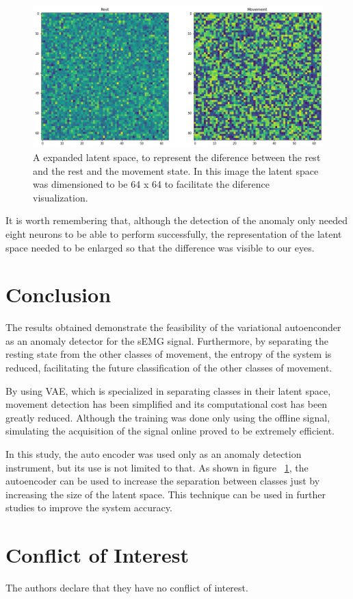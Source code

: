 \documentclass[nouppercase]{ifmbe}
\begin{document}
\begin{figure}[h]
    \begin{center}
	\includegraphics[width=.8\linewidth]{figuras/latent_space_as_image.png}
	\end{center}
	\caption{A expanded latent space, to represent the diference between the rest and the rest and the movement state. In this image the latent space was dimensioned to be 64 x 64 to facilitate the diference visualization.} \label{fig_lat_space_rep}
\end{figure}

It is worth remembering that, although the detection of the anomaly only needed eight neurons to be able to perform successfully, the representation of the latent space needed to be enlarged so that the difference was visible to our eyes.


\section{Conclusion}

The results obtained demonstrate the feasibility of the variational autoenconder as an anomaly detector for the sEMG signal. Furthermore, by separating the resting state from the other classes of movement, the entropy of the system is reduced, facilitating the future classification of the other classes of movement.

By using VAE, which is specialized in separating classes in their latent space, movement detection has been simplified and its computational cost has been greatly reduced. Although the training was done only using the offline signal, simulating the acquisition of the signal online proved to be extremely efficient.

In this study, the auto encoder was used only as an anomaly detection instrument, but its use is not limited to that. As shown in figure ~\ref{fig_lat_space_rep}, the autoencoder can be used to increase the separation between classes just by increasing the size of the latent space. This technique can be used in further studies to improve the system accuracy.

\section{Conflict of Interest}
The authors declare that they have no conflict of interest.



\end{document}
